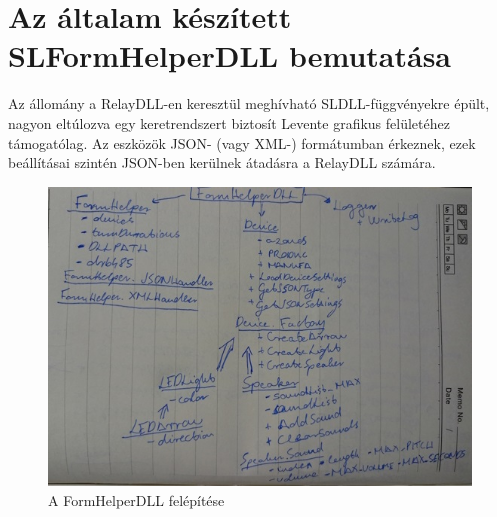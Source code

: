 \documentclass[tocnopagenum]{thesis-ekf}
\begin{document}
	
	\section{Az általam készített SLFormHelperDLL bemutatása}
	Az állomány a RelayDLL-en keresztül meghívható SLDLL-függvényekre épült, nagyon eltúlozva egy keretrendszert biztosít Levente grafikus felületéhez támogatólag. Az eszközök JSON- (vagy XML-) formátumban érkeznek, ezek beállításai szintén JSON-ben kerülnek átadásra a RelayDLL számára.
	
	\begin{figure}[h!]
		\centering
		\hspace*{-0.5in}
		\includegraphics[scale=0.7]{images/formhelper_kezi.jpg}
		\caption{A FormHelperDLL felépítése}
		\label{fig:formhelper_kezi}
	\end{figure}
	
\end{document}
